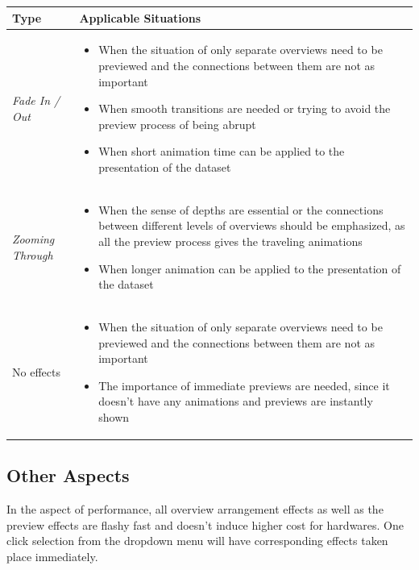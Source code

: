 \begingroup
\centering
\begin{tabu} to .97\textwidth { | X[1, r, m] | X[3, l, m] | }
    \hline
    Type & Applicable Situations \\
    \hline\hline
    \emph{Fade In / Out} &
    \vspace{.85em}\begin{itemize}
        \item When the situation of only separate overviews need to be previewed and the connections between them are not as important
        \item When smooth transitions are needed or trying to avoid the preview process of being abrupt
        \item When short animation time can be applied to the presentation of the dataset
    \end{itemize} \\
    \hline
    \emph{Zooming Through} &
    \vspace{.85em}\begin{itemize}
        \item When the sense of depths are essential or the connections between different levels of overviews should be emphasized, as all the preview process gives the traveling animations
        \item When longer animation can be applied to the presentation of the dataset
    \end{itemize} \\
    \hline
    No effects &
    \vspace{.85em}\begin{itemize}
        \item When the situation of only separate overviews need to be previewed and the connections between them are not as important
        \item The importance of immediate previews are needed, since it doesn't have any animations and previews are instantly shown
    \end{itemize} \\
    \hline
\end{tabu}
\label{tbl:preview:app}
\endgroup

\subsection{Other Aspects}

In the aspect of performance, all overview arrangement effects as well as the preview effects are flashy fast and doesn't induce higher cost for hardwares. One click selection from the dropdown menu will have corresponding effects taken place immediately.

